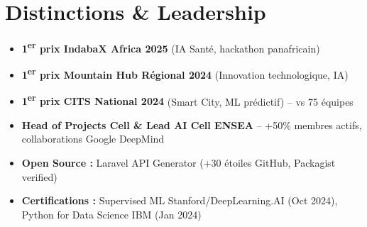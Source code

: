\documentclass[a4paper,11pt]{article}
\begin{document}
\section{Distinctions \& Leadership}
\begin{itemize}[leftmargin=*, label=\tiny$\bullet$, nosep]
    \item \small{\textbf{1\textsuperscript{er} prix IndabaX Africa 2025} (IA Sant\'e, hackathon panafricain)}
    \item \small{\textbf{1\textsuperscript{er} prix Mountain Hub R\'egional 2024} (Innovation technologique, IA)}
    \item \small{\textbf{1\textsuperscript{er} prix CITS National 2024} (Smart City, ML pr\'edictif) -- vs 75 \'equipes}
    \item \small{\textbf{Head of Projects Cell \& Lead AI Cell ENSEA} -- +50\% membres actifs, collaborations Google DeepMind}
    \item \small{\textbf{Open Source :} Laravel API Generator (+30 \'etoiles GitHub, Packagist verified)}
    \item \small{\textbf{Certifications :} Supervised ML Stanford/DeepLearning.AI (Oct 2024), Python for Data Science IBM (Jan 2024)}
\end{itemize}
\end{document}
